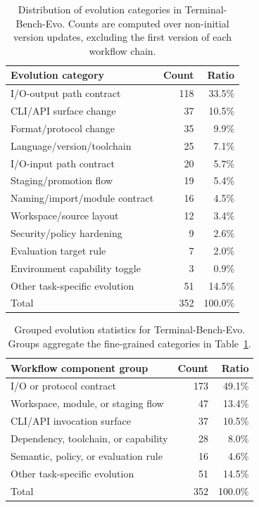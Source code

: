 \documentclass{article}
\begin{document}
\begin{table}[t]
\centering
\small
\begin{tabular}{lrr}
\toprule
\textbf{Evolution category} & \textbf{Count} & \textbf{Ratio} \\
\midrule
I/O-output path contract & 118 & 33.5\% \\
CLI/API surface change & 37 & 10.5\% \\
Format/protocol change & 35 & 9.9\% \\
Language/version/toolchain & 25 & 7.1\% \\
I/O-input path contract & 20 & 5.7\% \\
Staging/promotion flow & 19 & 5.4\% \\
Naming/import/module contract & 16 & 4.5\% \\
Workspace/source layout & 12 & 3.4\% \\
Security/policy hardening & 9 & 2.6\% \\
Evaluation target rule & 7 & 2.0\% \\
Environment capability toggle & 3 & 0.9\% \\
Other task-specific evolution & 51 & 14.5\% \\
\midrule
Total & 352 & 100.0\% \\
\bottomrule
\end{tabular}
\caption{Distribution of evolution categories in Terminal-Bench-Evo. Counts are computed over non-initial version updates, excluding the first version of each workflow chain.}
\label{tab:terminal_bench_evo_categories}
\end{table}

\begin{table}[t]
\centering
\small
\begin{tabular}{lrr}
\toprule
\textbf{Workflow component group} & \textbf{Count} & \textbf{Ratio} \\
\midrule
I/O or protocol contract & 173 & 49.1\% \\
Workspace, module, or staging flow & 47 & 13.4\% \\
CLI/API invocation surface & 37 & 10.5\% \\
Dependency, toolchain, or capability & 28 & 8.0\% \\
Semantic, policy, or evaluation rule & 16 & 4.6\% \\
Other task-specific evolution & 51 & 14.5\% \\
\midrule
Total & 352 & 100.0\% \\
\bottomrule
\end{tabular}
\caption{Grouped evolution statistics for Terminal-Bench-Evo. Groups aggregate the fine-grained categories in Table~\ref{tab:terminal_bench_evo_categories}.}
\label{tab:terminal_bench_evo_component_groups}
\end{table}
\end{document}
